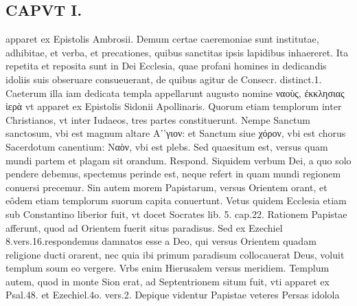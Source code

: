 \documentclass{article}
\begin{document}
\begin{pages}
\section*{CAPVT  I. }
\marginpar{[ p.73 ]}\pstart apparet ex Epistolis Ambrosii. Demum certae caeremoniae sunt institutae, adhibitae, et verba, et precationes, quibus sanctitas ipsis lapidibus inhaereret. Ita repetita et reposita sunt in Dei Ecclesia, quae profani homines in dedicandis idoliis suis obseruare consueuerant, de quibus agitur de Consecr. distinct.1. Caeterum illa iam dedicata templa appellarunt augusto nomine ναοὺς, ἐκκλησιας ἰερὰ vt apparet ex Epistolis Sidonii Apollinaris. Quorum etiam templorum inter Christianos, vt inter Iudaeos, tres partes constituerunt. Nempe Sanctum sanctosum, vbi est magnum altare Aʹ'γιον: et Sanctum siue χόρον, vbi est chorus Sacerdotum canentium: Ναὸν, vbi est plebs. Sed quaesitum est, versus quam mundi partem et plagam sit orandum. Respond. Siquidem verbum Dei, a quo solo pendere debemus, spectemus perinde est, neque refert in quam mundi regionem conuersi precemur. Sin autem morem Papistarum, versus Orientem orant, et eôdem etiam templorum suorum capita conuertunt. Vetus quidem Ecclesia etiam sub Constantino liberior fuit, vt docet Socrates lib.  5. cap.22. Rationem Papistae afferunt, quod ad Orientem fuerit situs paradisus. Sed ex Ezechiel 8.vers.16.respondemus damnatos esse a Deo, qui versus Orientem quadam religione ducti orarent, nec quia ibi primum paradisum collocauerat Deus, voluit templum soum eo vergere. Vrbs enim Hierusalem versus meridiem. Templum autem, quod in monte Sion erat, ad Septentrionem situm fuit, vti apparet ex Psal.48. et Ezechiel.4o. vers.2. Depique videntur Papistae veteres Persas idolola\pend

\end{pages}
\end{document}
